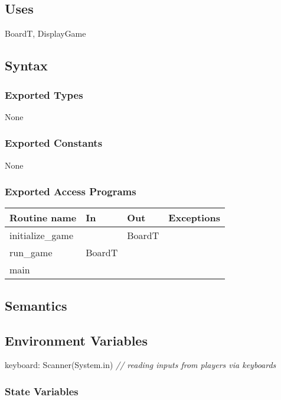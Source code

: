 \documentclass[12pt]{article}
\begin{document}
\subsection* {Uses}

BoardT, DisplayGame

\subsection* {Syntax}

\subsubsection* {Exported Types}

None

\subsubsection* {Exported Constants}

None

\subsubsection* {Exported Access Programs}

\begin{tabular}{| l | l | l | p{4.7cm} |}
\hline
\textbf{Routine name} & \textbf{In} & \textbf{Out} & \textbf{Exceptions}\\
\hline
initialize\_game & ~ & BoardT & ~ \\
\hline
run\_game & BoardT & ~ & ~\\
\hline
main & ~ & ~ & ~ \\
\hline
\end{tabular}

\subsection* {Semantics}

\subsection*{Environment Variables}

keyboard: Scanner(System.in) \qquad \textit{// reading inputs from players via keyboards}

\subsubsection* {State Variables}
\end{document}
